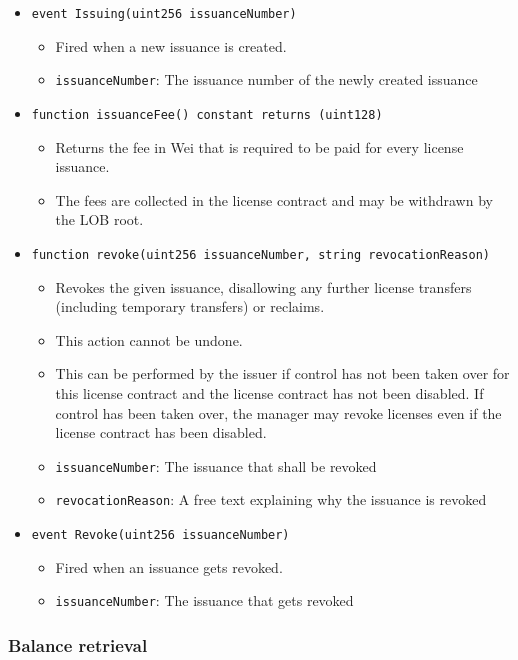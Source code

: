 \documentclass[a4paper]{article}
\begin{document}
\begin{itemize}
  \item \texttt{event Issuing(uint256 issuanceNumber)}
  \begin{itemize}
    \item Fired when a new issuance is created.
    \item \texttt{issuanceNumber}: The issuance number of the newly created issuance
  \end{itemize}
  
  \item \texttt{function issuanceFee() constant returns (uint128)}
  \begin{itemize}
    \item Returns the fee in Wei that is required to be paid for every license issuance.
    \item The fees are collected in the license contract and may be withdrawn by the LOB root.
  \end{itemize}
  
  \item \texttt{function revoke(uint256 issuanceNumber, string revocationReason)}
  \begin{itemize}
    \item Revokes the given issuance, disallowing any further license transfers (including temporary transfers) or reclaims. 
    \item This action cannot be undone.
    \item This can be performed by the issuer if control has not been taken over for this license contract and the license contract has not been disabled. If control has been taken over, the manager may revoke licenses even if the license contract has been disabled.
    \item \texttt{issuanceNumber}: The issuance that shall be revoked
    \item \texttt{revocationReason}: A free text explaining why the issuance is revoked
  \end{itemize}
  
  \item \texttt{event Revoke(uint256 issuanceNumber)}
  \begin{itemize}
    \item Fired when an issuance gets revoked.
    \item \texttt{issuanceNumber}: The issuance that gets revoked
  \end{itemize}
\end{itemize}

\subsubsection{Balance retrieval}
\end{document}
